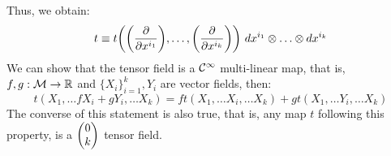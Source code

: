 Thus, we obtain: 
$$t \equiv t\qty(\qty(\pdv{x^{i_1}}), \ldots,\qty(\pdv{x^{i_k}})) \ dx^{i_1}\otimes \ldots \otimes dx^{i_k}$$
 We can show that the tensor field is a $\mathcal C^\infty$ multi-linear map, that is, $f,g: \mathcal M\rightarrow \mathbb{R}$ and $\{X_i\}_{i=1}^k, Y_i$ are vector fields, then:
 $$t(X_1,\ldots fX_i+gY_i, \ldots X_k) = ft(X_1,\ldots X_i, \ldots X_k) + gt(X_1,\ldots  Y_i, \ldots X_k)$$
 The converse of this statement is also true, that is, any map $t$ following this property, is a $\mqty(0\\k)$ tensor field. 